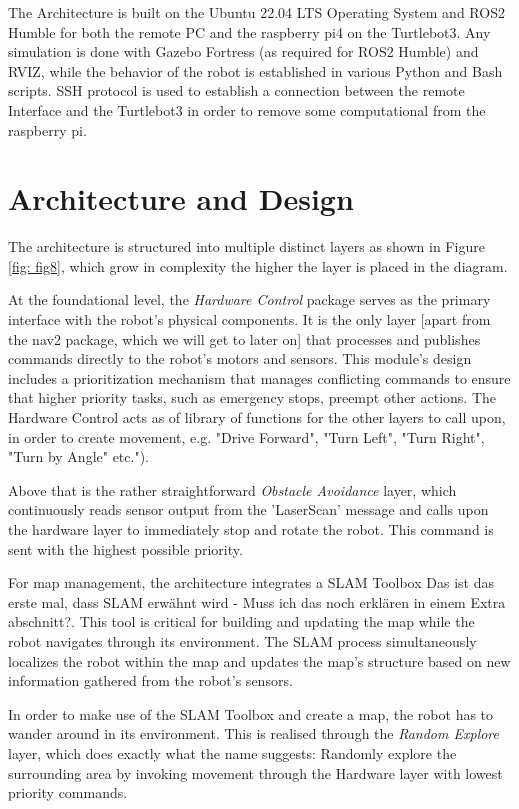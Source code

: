 \documentclass[%
paper=A4,               %
twoside=true,           %
openright,              %
11pt,                   %
bibliography=totoc,     %
titlepage=on,           %
DIV=12,                 %
BCOR=1.5cm,             %
parskip=half,            %
final
]{scrreprt}
\begin{document}
	 The Architecture is built on the Ubuntu 22.04 LTS Operating System and ROS2 Humble for both the remote PC and the raspberry pi4 on the Turtlebot3. Any simulation is done with Gazebo Fortress (as required for ROS2 Humble) and RVIZ, while the behavior of the robot is established in various Python and Bash scripts. SSH protocol is used to establish a connection between the remote Interface and the Turtlebot3 in order to remove some computational from the raspberry pi. 
	 
	 
	\section{Architecture and Design}
	
	The architecture is structured into multiple distinct layers as shown in Figure \ref{fig: fig8}, which grow in complexity the higher the layer is placed in the diagram.
	
	At the foundational level, the \textit{Hardware Control} package serves as the primary interface with the robot's physical components. It is the only layer [apart from the nav2 package, which we will get to later on] that processes and publishes commands directly to the robot's motors and sensors. This module's design includes a prioritization mechanism that manages conflicting commands to ensure that higher priority tasks, such as emergency stops, preempt other actions. The Hardware Control acts as of library of functions for the other layers to call upon, in order to create movement, e.g. "Drive Forward", "Turn Left", "Turn Right", "Turn by Angle" etc.").
	
	Above that is the rather straightforward \textit{Obstacle Avoidance} layer, which continuously reads sensor output from the 'LaserScan' message \autocite{ros.orgLaserScanMessage2024a} and calls upon the hardware layer to immediately stop and rotate the robot. This command is sent with the highest possible priority. 
	
	For map management, the architecture integrates a SLAM Toolbox {\color{red} Das ist das erste mal, dass SLAM erwähnt wird - Muss ich das noch erklären in einem Extra abschnitt?}. This tool is critical for building and updating the map while the robot navigates through its environment. The SLAM process simultaneously localizes the robot within the map and updates the map's structure based on new information gathered from the robot's sensors.
	
	In order to make use of the SLAM Toolbox and create a map, the robot has to wander around in its environment. This is realised through the \textit{Random Explore} layer, which does exactly what the name suggests: Randomly explore the surrounding area by invoking movement through the Hardware layer with lowest priority commands. 
	
\end{document}
